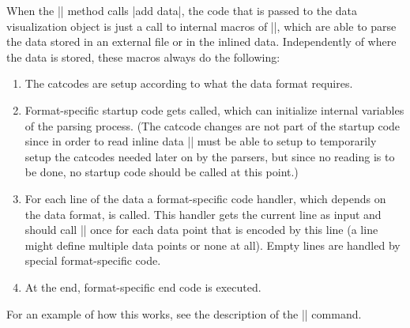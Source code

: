 \begin{command}{\pgfdata{}}
    When the |\pgfdata| method calls |add data|, the code that is passed to the
    data visualization object is just a call to internal macros of |\pgfdata|,
    which are able to parse the data stored in an external file or in the
    inlined data. Independently of where the data is stored, these macros
    always do the following:
    \begin{enumerate}
        \item The catcodes are setup according to what the data format
            requires.
        \item Format-specific startup code gets called, which can initialize
            internal variables of the parsing process. (The catcode changes are
            not part of the startup code since in order to read inline data
            |\pgfdata| must be able to setup to temporarily setup the catcodes
            needed later on by the parsers, but since no reading is to be done,
            no startup code should be called at this point.)
        \item For each line of the data a format-specific code handler, which
            depends on the data format, is called. This handler gets the
            current line as input and should call |\pgfdatapoint| once for each
            data point that is encoded by this line (a line might define
            multiple data points or none at all). Empty lines are handled by
            special format-specific code.
        \item At the end, format-specific end code is executed.
    \end{enumerate}
    For an example of how this works, see the description of the
    |\pgfdeclaredataformat| command.



\end{command}
